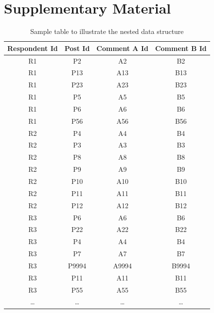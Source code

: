 \documentclass{article}
\begin{document}
\newpage



\clearpage
\section{Supplementary Material}

\begin{table}[htbp]
    \centering
    \begin{tabular}{|c|c|c|c|}
    \hline
    \textbf{Respondent Id} & \textbf{Post Id} & \textbf{Comment A Id} & \textbf{Comment B Id} \\
    \hline
    R1 & P2 & A2 & B2 \\
    R1 & P13 & A13 & B13 \\
    R1 & P23 & A23 & B23 \\
    R1 & P5 & A5 & B5 \\
    R1 & P6 & A6 & B6 \\
    R1 & P56 & A56 & B56 \\
    \midrule
    R2 & P4 & A4 & B4 \\
    R2 & P3 & A3 & B3 \\
    R2 & P8 & A8 & B8 \\
    R2 & P9 & A9 & B9 \\
    R2 & P10 & A10 & B10 \\
    R2 & P11 & A11 & B11 \\
    R2 & P12 & A12 & B12 \\
    \midrule
    R3 & P6 & A6 & B6 \\
    R3 & P22 & A22 & B22 \\
    R3 & P4 & A4 & B4 \\
    R3 & P7 & A7 & B7 \\
    R3 & P9994 & A9994 & B9994 \\
    R3 & P11 & A11 & B11 \\
    R3 & P55 & A55 & B55 \\
    \dots & \dots & \dots & \dots \\
    \hline
    \end{tabular}
    \caption{Sample table to illustrate the nested data structure}
    \label{sample-table}
\end{table}

\clearpage

\end{document}
